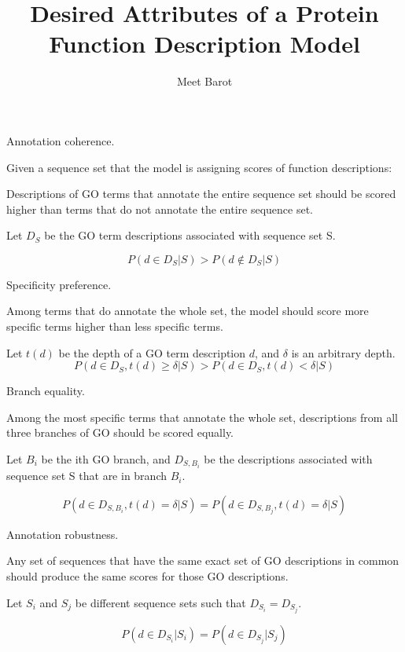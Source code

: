 \documentclass{specification}
\title{Desired Attributes of a Protein Function Description Model}
\author{Meet Barot}
\begin{document}
\maketitle

\attribute*

Annotation coherence.

Given a sequence set that the model is assigning scores of function descriptions:

Descriptions of GO terms that annotate the entire sequence set should be scored higher than terms that do not annotate the entire sequence set.

Let $D_{S}$ be the GO term descriptions associated with sequence set S.

\[P(d \in D_{S} | S) > P(d \notin D_{S} | S)\]

\attribute*

Specificity preference.

Among terms that do annotate the whole set, the model should score more specific terms higher than less specific terms.

Let $t(d)$ be the depth of a GO term description $d$, and $\delta$ is an arbitrary depth.
\[P(d \in D_{S}, t(d) \geq \delta | S) > P(d \in D_{S}, t(d) < \delta | S)\]

\attribute*

Branch equality.

Among the most specific terms that annotate the whole set, descriptions from all three branches of GO should be scored equally.

Let $B_i$ be the ith GO branch, and $D_{S, B_i}$ be the descriptions associated with sequence set S that are in branch $B_i$.

\[P(d \in D_{S, B_i}, t(d) = \delta | S) = P(d \in D_{S, B_j}, t(d) = \delta | S)\]

\attribute*

Annotation robustness.

Any set of sequences that have the same exact set of GO descriptions in common should produce the same scores for those GO descriptions.

Let $S_i$ and $S_j$ be different sequence sets such that $D_{S_i} = D_{S_j}$.

\[P(d \in D_{S_i} | S_i) = P(d \in D_{S_j} | S_j)\]

 
%
%
\end{document}
